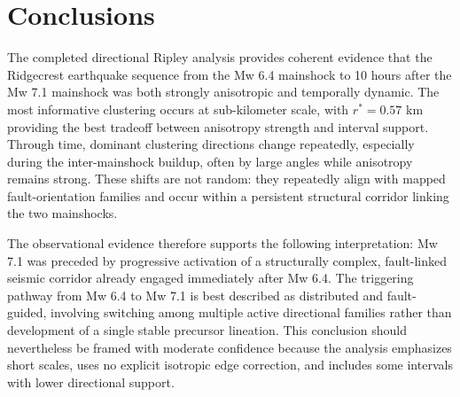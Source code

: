 \documentclass[11pt]{article}
\begin{document}
\section{Conclusions}
The completed directional Ripley analysis provides coherent evidence that the Ridgecrest earthquake sequence from the Mw 6.4 mainshock to 10 hours after the Mw 7.1 mainshock was both strongly anisotropic and temporally dynamic. The most informative clustering occurs at sub-kilometer scale, with $r^{\ast}=0.57$ km providing the best tradeoff between anisotropy strength and interval support. Through time, dominant clustering directions change repeatedly, especially during the inter-mainshock buildup, often by large angles while anisotropy remains strong. These shifts are not random: they repeatedly align with mapped fault-orientation families and occur within a persistent structural corridor linking the two mainshocks.

The observational evidence therefore supports the following interpretation: Mw 7.1 was preceded by progressive activation of a structurally complex, fault-linked seismic corridor already engaged immediately after Mw 6.4. The triggering pathway from Mw 6.4 to Mw 7.1 is best described as distributed and fault-guided, involving switching among multiple active directional families rather than development of a single stable precursor lineation. This conclusion should nevertheless be framed with moderate confidence because the analysis emphasizes short scales, uses no explicit isotropic edge correction, and includes some intervals with lower directional support.
\end{document}
